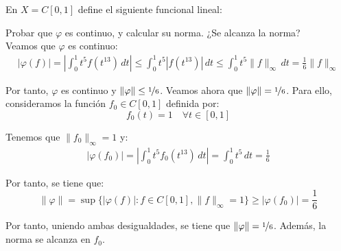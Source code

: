 \documentclass[12pt]{article}
\begin{document}
\begin{ejercicio}[2.5 puntos]
    En $X=C[0,1]$ define el siguiente funcional lineal:

    Probar que $\varphi$ es continuo, y calcular su norma. ¿Se alcanza la norma?\\

    Veamos que $\varphi$ es continuo:
    \begin{align*}
        |\varphi(f)| = \left|\int_{0}^{1} t^5 f(t^{13})\,dt\right| \leq \int_{0}^{1} t^5 |f(t^{13})|\,dt \leq \int_{0}^{1} t^5 \|f\|_\infty\,dt = \frac{1}{6} \|f\|_\infty
    \end{align*}

    Por tanto, $\varphi$ es continuo y $\|\varphi\| \leq \nicefrac{1}{6}$. Veamos ahora que $\|\varphi\| = \nicefrac{1}{6}$. Para ello, consideramos la función $f_0 \in C[0,1]$ definida por:
    \begin{equation*}
        f_0(t) = 1 \quad \forall t \in [0, 1]
    \end{equation*}

    Tenemos que $\|f_0\|_\infty = 1$ y:
    \begin{align*}
        |\varphi(f_0)| = \left|\int_{0}^{1} t^5 f_0(t^{13})\,dt\right| = \int_{0}^{1} t^5\,dt = \frac{1}{6}
    \end{align*}

    Por tanto, se tiene que:
    \begin{equation*}
        \|\varphi\| = \sup\{|\varphi(f)| : f \in C[0,1], \|f\|_\infty = 1\} \geq |\varphi(f_0)| = \frac{1}{6}
    \end{equation*}

    Por tanto, uniendo ambas desigualdades, se tiene que $\|\varphi\| = \nicefrac{1}{6}$. Además, la norma se alcanza en $f_0$.
\end{ejercicio}
\end{document}
